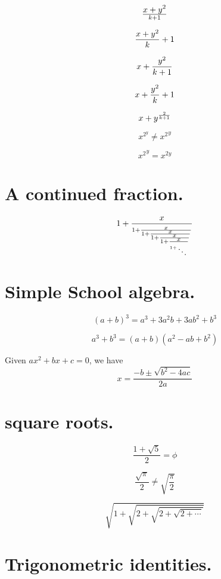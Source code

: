 $$x+y^2\over k+1$$

$${x+y^2\over k}+1$$

$$x+{y^2\over k+1}$$

$$x+{y^2\over k}+1$$

$$x+y^{2\over k+1}$$

$$x^{2^y} \neq {x^2}^y$$

$${x^2}^y = x^{2y}$$



\section{A continued fraction. }

\[
1+  {x \over
 {\scriptstyle 1+ {\scriptstyle x \over
 {\scriptstyle 1 + {\scriptstyle x \over
 {\scriptstyle 1 + {\scriptstyle x \over
 {\scriptstyle 1+ {\scriptstyle x \over
1+{\scriptstyle
  \atop \ddots }}}}}}}}}}
\]



\section{Simple  School  algebra.   }

$$(a+b)^3=a^3+3a^2b+3ab^2+b^3$$

$$a^3+b^3=(a+b)(a^2-ab+b^2)$$

Given $ax^2+bx+c=0$, we have
$$x= \frac{-b \pm \sqrt{b^2-4ac}}{2a}$$



\section{square roots.  }

$$\frac{1+\sqrt{5}}{2}=\phi$$

$$\frac{\sqrt{\pi}}{2} \neq \sqrt{\frac{\pi}{2}}$$

$$\sqrt{1+\sqrt{2+\sqrt{2+\sqrt {2+\cdots }}}}$$



\section{Trigonometric identities. }

